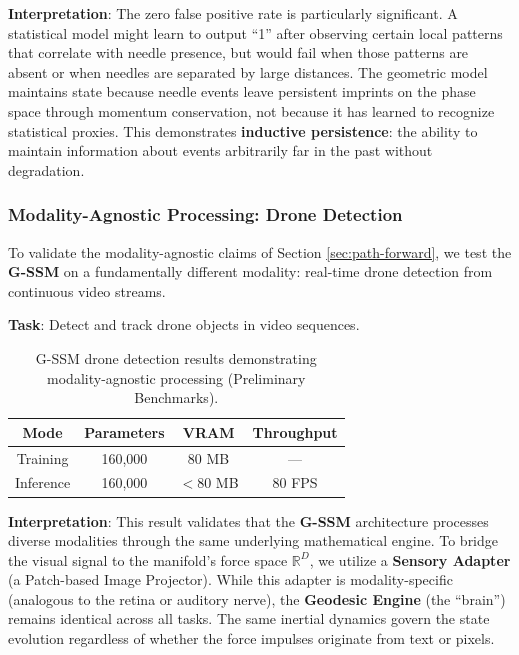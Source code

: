 \documentclass[12pt,a4paper]{article}
\begin{document}
\noindent\textbf{Interpretation}: The zero false positive rate is particularly significant. A statistical model might learn to output ``1'' after observing certain local patterns that correlate with needle presence, but would fail when those patterns are absent or when needles are separated by large distances. The geometric model maintains state because needle events leave persistent imprints on the phase space through momentum conservation, not because it has learned to recognize statistical proxies. This demonstrates \textbf{inductive persistence}: the ability to maintain information about events arbitrarily far in the past without degradation.

\subsubsection{Modality-Agnostic Processing: Drone Detection}
\label{sec:multimodal-experiment}

To validate the modality-agnostic claims of Section \ref{sec:path-forward}, we test the \textbf{G-SSM} on a fundamentally different modality: real-time drone detection from continuous video streams.

\textbf{Task}: Detect and track drone objects in video sequences.

\begin{table}[htbp]
    \centering
    \caption{G-SSM drone detection results demonstrating modality-agnostic processing (Preliminary Benchmarks).}
    \label{tab:drone-results}
    \begin{tabular}{cccc}
        \toprule
        \textbf{Mode} & \textbf{Parameters} & \textbf{VRAM} & \textbf{Throughput} \\
        \midrule
        Training & 160,000 & 80 MB & --- \\
        Inference & 160,000 & $<$80 MB & 80 FPS \\
        \bottomrule
    \end{tabular}
\end{table}

\noindent\textbf{Interpretation}: This result validates that the \textbf{G-SSM} architecture processes diverse modalities through the same underlying mathematical engine. To bridge the visual signal to the manifold's force space $\mathbb{R}^D$, we utilize a \textbf{Sensory Adapter} (a Patch-based Image Projector). While this adapter is modality-specific (analogous to the retina or auditory nerve), the \textbf{Geodesic Engine} (the ``brain'') remains identical across all tasks. The same inertial dynamics govern the state evolution regardless of whether the force impulses originate from text or pixels.
\end{document}
